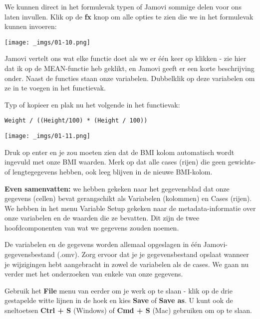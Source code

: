 \documentclass[
  letterpaper,
  DIV=11,
  numbers=noendperiod]{scrartcl}
\begin{document}
We kunnen direct in het formulevak typen of Jamovi sommige delen voor
ons laten invullen. Klik op de \textbf{fx} knop om alle opties te zien
die we in het formulevak kunnen invoeren:

\texttt{[image: \_imgs/01-10.png]}

Jamovi vertelt ons wat elke functie doet als we er één keer op klikken -
zie hier dat ik op de MEAN-functie heb geklikt, en Jamovi geeft er een
korte beschrijving onder. Naast de functies staan onze variabelen.
Dubbelklik op deze variabelen om ze in te voegen in het functievak.

Typ of kopieer en plak nu het volgende in het functievak:

\begin{verbatim}
Weight / ((Height/100) * (Height / 100))
\end{verbatim}

\texttt{[image: \_imgs/01-11.png]}

Druk op enter en je zou moeten zien dat de BMI kolom automatisch wordt
ingevuld met onze BMI waarden. Merk op dat alle cases (rijen) die geen
gewichts- of lengtegegevens hebben, ook leeg blijven in de nieuwe
BMI-kolom.

\textbf{Even samenvatten:} we hebben gekeken naar het gegevensblad dat
onze gegevens (cellen) bevat gerangschikt als Variabelen (kolommen) en
Cases (rijen). We hebben in het menu Variable Setup gekeken naar de
metadata-informatie over onze variabelen en de waarden die ze bevatten.
Dit zijn de twee hoofdcomponenten van wat we gegevens zouden noemen.

De variabelen en de gegevens worden allemaal opgeslagen in één
Jamovi-gegevensbestand (.omv). Zorg ervoor dat je je gegevensbestand
opslaat wanneer je wijzigingen hebt aangebracht in zowel de variabelen
als de cases. We gaan nu verder met het onderzoeken van enkele van onze
gegevens.

\begin{tcolorbox}[beforeafter skip=1cm, ignore nobreak=true, breakable, colframe=Aside-frame, colback=Aside-bg, coltext=Aside-text, boxsep=2mm, arc=0mm, boxrule=0.5mm]

Gebruik het \textbf{File} menu van eerder om je werk op te slaan - klik
op de drie gestapelde witte lijnen in de hoek en kies \textbf{Save} of
\textbf{Save as}. U kunt ook de sneltoetsen \textbf{Ctrl + S} (Windows)
of \textbf{Cmd + S} (Mac) gebruiken om op te slaan.

\end{tcolorbox}
\end{document}
